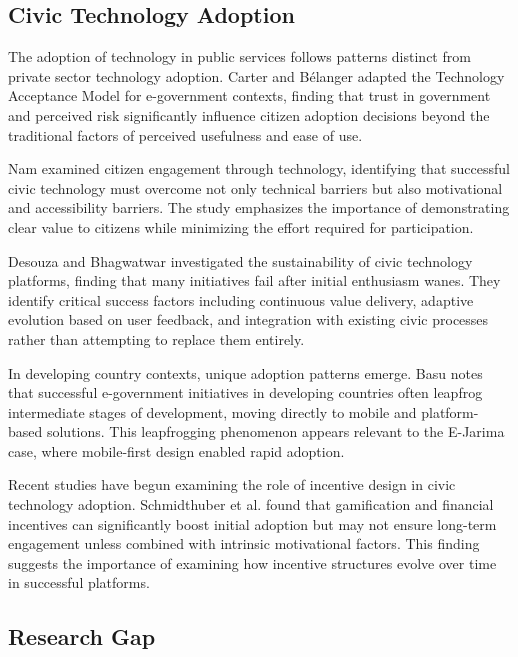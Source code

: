 \documentclass[pdflatex,sn-mathphys-num]{sn-jnl}%
\theoremstyle{thmstyleone}%
\theoremstyle{thmstyletwo}%
\theoremstyle{thmstylethree}%
\begin{document}
\subsection{Civic Technology Adoption}\label{subsec6}

The adoption of technology in public services follows patterns distinct from private sector technology adoption. Carter and Bélanger \cite{carter2005citizens} adapted the Technology Acceptance Model for e-government contexts, finding that trust in government and perceived risk significantly influence citizen adoption decisions beyond the traditional factors of perceived usefulness and ease of use.

Nam \cite{nam2012citizens} examined citizen engagement through technology, identifying that successful civic technology must overcome not only technical barriers but also motivational and accessibility barriers. The study emphasizes the importance of demonstrating clear value to citizens while minimizing the effort required for participation.

Desouza and Bhagwatwar \cite{desouza2014technology} investigated the sustainability of civic technology platforms, finding that many initiatives fail after initial enthusiasm wanes. They identify critical success factors including continuous value delivery, adaptive evolution based on user feedback, and integration with existing civic processes rather than attempting to replace them entirely.

In developing country contexts, unique adoption patterns emerge. Basu \cite{basu2004egovernment} notes that successful e-government initiatives in developing countries often leapfrog intermediate stages of development, moving directly to mobile and platform-based solutions. This leapfrogging phenomenon appears relevant to the E-Jarima case, where mobile-first design enabled rapid adoption.

Recent studies have begun examining the role of incentive design in civic technology adoption. Schmidthuber et al. \cite{schmidthuber2017gamification} found that gamification and financial incentives can significantly boost initial adoption but may not ensure long-term engagement unless combined with intrinsic motivational factors. This finding suggests the importance of examining how incentive structures evolve over time in successful platforms.

\subsection{Research Gap}\label{subsec7}
\end{document}
